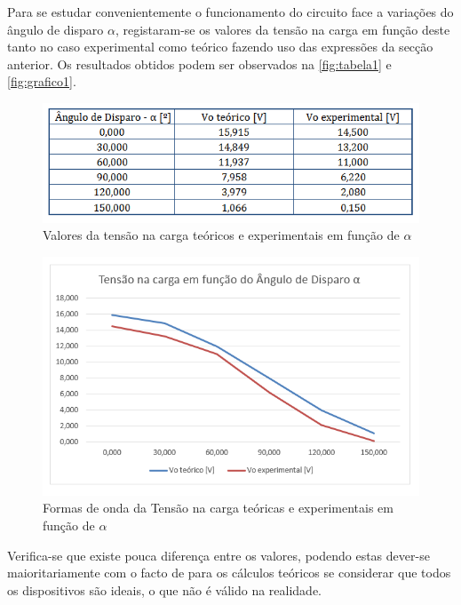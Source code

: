 \documentclass[a4paper,11pt]{article}
\numberwithin{equation}{section}
\begin{document}
Para se estudar convenientemente o funcionamento do circuito face a variações do ângulo de disparo $\alpha$, registaram-se os valores da tensão na carga em função deste tanto no caso experimental como teórico fazendo uso das expressões da secção anterior. Os resultados obtidos podem ser observados na \autoref{fig:tabela1} e \autoref{fig:grafico1}. 

\begin{figure}[H]
	\centering
	\includegraphics[keepaspectratio=true, scale=0.8]{teoricas/tabela1}
	\caption{Valores da tensão na carga teóricos e experimentais em função de $\alpha$}
	\label{fig:tabela1}
	\vspace{-0.8em}
\end{figure}

\begin{figure}[H]
	\centering
	\includegraphics[keepaspectratio=true, scale=0.8]{teoricas/grafico1}
	\caption{Formas de onda da Tensão na carga teóricas e experimentais em função de $\alpha$}
	\label{fig:grafico1}
	\vspace{-0.8em}
\end{figure}


Verifica-se que existe pouca diferença entre os valores, podendo estas dever-se maioritariamente com o facto de para os cálculos teóricos se considerar que todos os dispositivos são ideais, o que não é válido na realidade.
\end{document}
